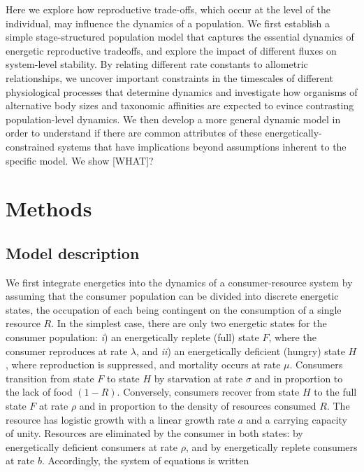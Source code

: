 \documentclass[12pt,english]{article}
\begin{document}
\begin{spacing}{1.9}
Here we explore how reproductive trade-offs, which occur at the level of the individual, may influence the dynamics of a population.
We first establish a simple stage-structured population model that captures the essential dynamics of energetic reproductive tradeoffs, and explore the impact of different fluxes on system-level stability.
By relating different rate constants to allometric relationships, we uncover important constraints in the timescales of different physiological processes that determine dynamics and investigate how organisms of alternative body sizes and taxonomic affinities are expected to evince contrasting population-level dynamics.
We then develop a more general dynamic model in order to understand if there are common attributes of these energetically-constrained systems that have implications beyond assumptions inherent to the specific model.
We show [WHAT]?




\section{Methods}
\subsection{Model description}

We first integrate energetics into the dynamics of a consumer-resource system by assuming that the consumer population can be divided into discrete energetic states, the occupation of each being contingent on the consumption of a single resource $R$.
In the simplest case, there are only two energetic states for the consumer population: \emph{i}) an energetically replete (full) state $F$, where the consumer reproduces at rate $\lambda$, and \emph{ii}) an energetically deficient (hungry) state $H$, where reproduction is suppressed, and mortality occurs at rate $\mu$.
Consumers transition from state $F$ to state $H$ by starvation at rate $\sigma$ and in proportion to the lack of food $(1-R)$.
Conversely, consumers recover from state $H$ to the full state $F$ at rate $\rho$ and in proportion to the density of resources consumed $R$.
The resource has logistic growth with a linear growth rate $a$ and a carrying capacity of unity.
Resources are eliminated by the consumer in both states: by energetically deficient consumers at rate $\rho$, and by energetically replete consumers at rate $b$.
Accordingly, the system of equations is written


\end{spacing}
\end{document}
